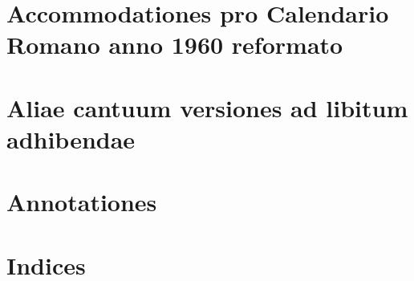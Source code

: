 \documentclass[12pt, a5paper, twoside]{book}
\begin{document}



\part{Accommodationes pro Calendario Romano anno 1960 reformato}




\part{Aliae cantuum versiones ad libitum adhibendae}

\part{Annotationes}



\part{Indices}

\end{document}
